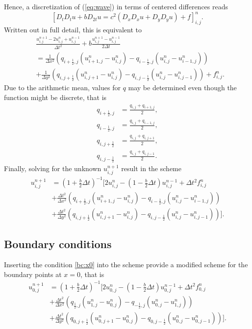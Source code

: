 \documentclass[twoside]{article}
\begin{document}
Hence, a discretization of (\ref{eq:wave}) in terms of centered differences reads
\begin{equation*}
\left[D_t D_t u + b D_{2t} u = c^2(D_x D_x u + D_y D_y u) + f \right]_{i,j}^n.
\end{equation*}
Written out in full detail, this is equivalent to
\begin{align*}
&\frac{u_{i,j}^{n+1} - 2u_{i,j}^n + u_{i,j}^{n-1}} {\Delta t^2} + b\frac{u_{i,j}^{n+1} - u_{i,j}^{n-1}}{2\Delta t} \\
&= \frac{1}{\Delta x^2} \left(q_{i+\frac{1}{2}, j} (u_{i+1,j}^n - u_{i,j}^n) - q_{i-\frac{1}{2}, j}(u_{i,j}^n - u_{i-1,j}^n) \right) \\
&+ \frac{1}{\Delta y^2} \left(q_{i, j+ \frac{1}{2}} (u_{i,j+1}^n - u_{i,j}^n) - q_{i, j-\frac{1}{2}}(u_{i,j}^n - u_{i,j-1}^n) \right) + f_{i,j}^n.
\end{align*}
Due to the arithmetic mean, values for $q$ may be determined even though the function might be discrete, that is
\begin{align*}
q_{i+\frac{1}{2}, j} &= \frac{q_{i,j} + q_{i+1,j}}{2}, \\
q_{i-\frac{1}{2}, j} &= \frac{q_{i,j} + q_{i-1,j}}{2}, \\
q_{i,j+\frac{1}{2}} &= \frac{q_{i,j} + q_{i,j+1}}{2}, \\
q_{i,j-\frac{1}{2}} &= \frac{q_{i,j} + q_{i,j-1}}{2}.
\end{align*} 
Finally, solving for the unknown $u_{i,j}^{n+1}$ result in the scheme
\begin{align}
u_{i,j}^{n+1} &= (1+\frac{b}{2}\Delta t)^{-1} \bigg[2u_{i,j}^n - (1-\frac{b}{2}\Delta t) u_{i,j}^{n-1} + \Delta t^2 f_{i,j}^n \nonumber \\
&+ \frac{\Delta t^2}{\Delta x^2} \left(q_{i+\frac{1}{2},j} (u_{i+1,j}^n - u_{i,j}^n) -  q_{i-\frac{1}{2},j} (u_{i,j}^n - u_{i-1,j}^n) \right) \\
&+ \frac{\Delta t^2}{\Delta y^2} \left(q_{i,j+\frac{1}{2}} (u_{i,j+1}^n - u_{i,j}^n) -  q_{i,j-\frac{1}{2}} (u_{i,j}^n - u_{i,j-1}^n) \right) \bigg]. \nonumber
\end{align}

\subsection{Boundary conditions}

Inserting the condition  \eqref{bc:x0} into the scheme provide a modified scheme for the boundary points at $x=0$, that is
\begin{align}
u_{0,j}^{n+1} &= (1+\frac{b}{2}\Delta t)^{-1} \bigg[2u_{0,j}^n - (1-\frac{b}{2}\Delta t) u_{0,j}^{n-1} + \Delta t^2 f_{0,j}^n \nonumber \\
&+ \frac{\Delta t^2}{\Delta x^2} \left(q_{\frac{1}{2},j} (u_{1,j}^n - u_{0,j}^n) -  q_{-\frac{1}{2},j} (u_{0,j}^n - u_{1,j}^n) \right) \\
&+ \frac{\Delta t^2}{\Delta y^2} \left(q_{0,j+\frac{1}{2}} (u_{0,j+1}^n - u_{0,j}^n) -  q_{0,j-\frac{1}{2}} (u_{0,j}^n - u_{0,j-1}^n) \right) \bigg]. \nonumber
\end{align}
\end{document}
